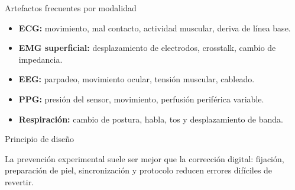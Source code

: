 \documentclass[
  10pt,
  ignorenonframetext,
  aspectratio=169,
  spanish,
]{beamer}
\providecommand{\tightlist}{%
  \setlength{\itemsep}{0pt}\setlength{\parskip}{0pt}}
\begin{document}
\begin{frame}{Artefactos frecuentes por modalidad}
\label{d1-022}
\begin{itemize}
\tightlist
\item
  \textbf{ECG:} movimiento, mal contacto, actividad muscular, deriva de
  línea base.
\item
  \textbf{EMG superficial:} desplazamiento de electrodos, crosstalk,
  cambio de impedancia.
\item
  \textbf{EEG:} parpadeo, movimiento ocular, tensión muscular, cableado.
\item
  \textbf{PPG:} presión del sensor, movimiento, perfusión periférica
  variable.
\item
  \textbf{Respiración:} cambio de postura, habla, tos y desplazamiento
  de banda.
\end{itemize}

\begin{block}{Principio de diseño}

La prevención experimental suele ser mejor que la corrección digital:
fijación, preparación de piel, sincronización y protocolo reducen
errores difíciles de revertir.

\end{block}

\end{frame}
\end{document}
